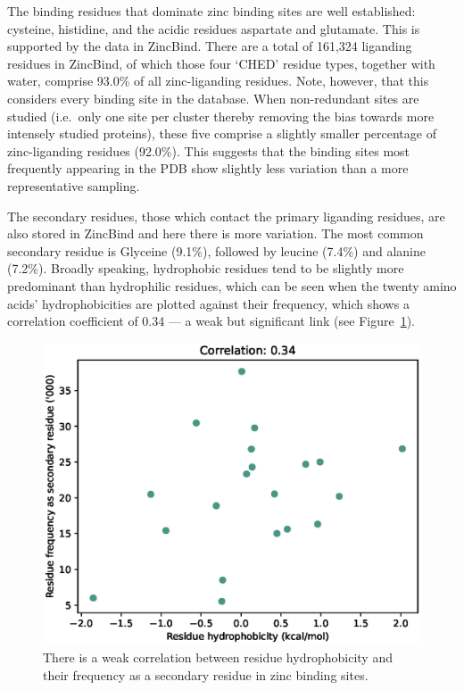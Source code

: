 The binding residues that dominate zinc binding sites are well established: cysteine, histidine, and the acidic residues aspartate and glutamate. This is supported by the data in ZincBind. There are a total of 161,324 liganding residues in ZincBind, of which those four `CHED' residue types, together with water, comprise 93.0\% of all zinc-liganding residues. Note, however, that this considers every binding site in the database. When non-redundant sites are studied (i.e.\ only one site per cluster thereby removing the bias towards more intensely studied proteins), these five comprise a slightly smaller percentage of zinc-liganding residues (92.0\%). This suggests that the binding sites most frequently appearing in the PDB show slightly less variation than a more representative sampling.

The secondary residues, those which contact the primary liganding residues, are also stored in ZincBind and here there is more variation. The most common secondary residue is Glyceine (9.1\%), followed by leucine (7.4\%) and alanine (7.2\%). Broadly speaking, hydrophobic residues tend to be slightly more predominant than hydrophilic residues, which can be seen when the twenty amino acids' hydrophobicities are plotted against their frequency, which shows a correlation coefficient of 0.34 --- a weak but significant link (see Figure~\ref{fig:secondary-residues}).

\begin{figure}
\centering
\includegraphics[width=1.0\textwidth]{Figures/secondary-residues.eps}
\caption[Correlation between residue hydrophobicity and their frequency as a secondary residue in zinc binding sites]{\label{fig:secondary-residues} There is a weak correlation between residue hydrophobicity and their frequency as a secondary residue in zinc binding sites.}
\end{figure}

